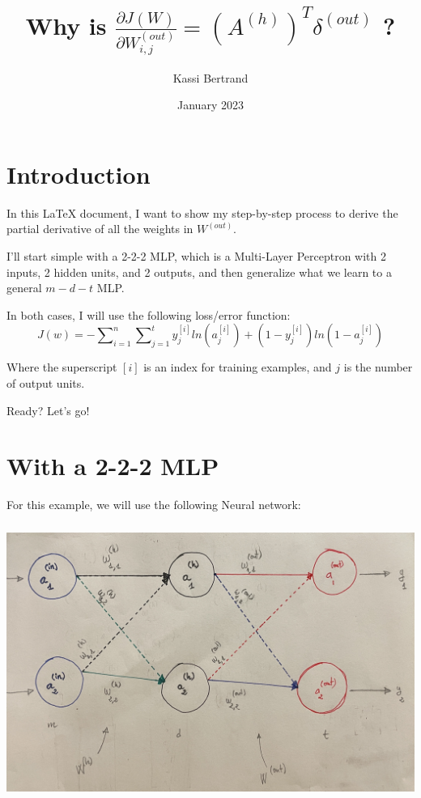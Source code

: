 \documentclass[12pt, letterpaper]{article}
\title{Why is $ \frac{\partial J(W)}{\partial W_{i,j}^{(out)}} = (A^{(h)})^{T} \delta^{(out)}$ ?}
\author{Kassi Bertrand}
\date{January 2023}
\begin{document}
\maketitle

\section{Introduction}
In this \LaTeX{} document, I want to show my step-by-step process
to derive the partial derivative of all the weights in $W^{(out)}$.

\vspace{5mm} %

I'll start simple with a 2-2-2 MLP, which is a Multi-Layer Perceptron
with 2 inputs, 2 hidden units, and 2 outputs, and then generalize
what we learn to a general $m-d-t$ MLP.

\vspace{5mm} %

In both cases, I will use the following loss/error function:
\[J(w) = -\sum\nolimits_{i = 1}^{n}\sum\nolimits_{j=1}^{t} y_j^{[i]} ln(a_j^{[i]}) + (1 - y_j^{[i]})ln(1 - a_j^{[i]})\]

Where the superscript $[i]$ is an index for training examples,
and $j$ is the number of output units.

\vspace{5mm} %

Ready? Let's go!

\pagebreak
\section{With a 2-2-2 MLP}

For this example, we will use the following Neural network:

\begin{center}
    \includegraphics[width = 16cm, height = 9cm]{2-2-2-mlp.jpg}
\end{center}
\end{document}
